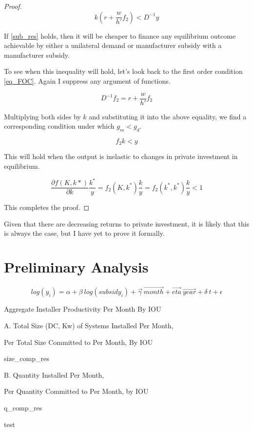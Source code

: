 \documentclass{article}
\begin{document}
\begin{proof}
\begin{equation}
k \left( r + \frac{w}{h'} f_2 \right) < D^{-1} y
\label{sub_res}
\end{equation}

If \ref{sub_res} holds, then it will be cheaper to finance any equilibrium outcome achievable by either a unilateral demand or manufacturer subsidy with a manufacturer subsidy.

To see when this inequality will hold, let's look back to the first order condition \ref{eq_FOC}. Again I suppress any argument of functions.

\[
D^{-1} f_2 = r + \frac{w}{h'} f_2 
\]

Multiplying both sides by $k$ and substituting it into the above equality, we find a corresponding condition under which $g_m < g_d$.

\[
 f_2 k < y
\]

This will hold when the output is inelastic to changes in private investment in equilibrium.

 \[
 \frac{\partial f(K,k*)}{\partial k} \frac{k^*}{y} = f_2(K,k^*) \frac{k}{y} =  f_2(k^*,k^*) \frac{k}{y} <  1
 \]

This completes the proof.
\end{proof}

Given that there are decreasing returns to private investment, it is likely that this is always the case, but I have yet to prove it formally.


\section{Preliminary Analysis}

\begin{equation}
log(y_i) = \alpha + \beta ~ log(subsidy_i) + \vec{\gamma} ~ \vec{month} + \vec{eta} ~ \vec{year} + \delta~ t + \epsilon
\end{equation}

\begin{table}
\begin{center}
Aggregate Installer Productivity Per Month By IOU

\vspace{0.5cm}

A. Total Size (DC, Kw) of Systems Installed Per Month, 

Per Total Size Committed to Per Month, By IOU

\vspace{0.25cm}

{size_comp_res}

\vspace{0.5cm}

B. Quantity Installed Per Month, 

Per Quantity Committed to Per Month, by IOU

\vspace{0.25cm}

{q_comp_res}
\end{center}
\caption{test}
\label{agg_prod_tab}
\end{table}
\end{document}
